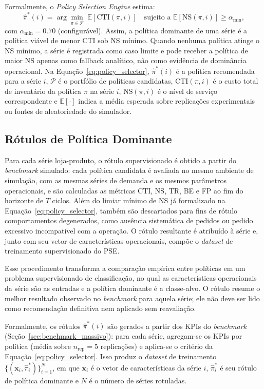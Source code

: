 Formalmente, o \textit{Policy Selection Engine} estima:
\begin{equation}
  \hat{\pi}^*(i) = \arg\min_{\pi \in \mathcal{P}} \; \mathbb{E}[\text{CTI}(\pi, i)]
  \quad \text{sujeito a } \mathbb{E}[\text{NS}(\pi, i)] \geq \alpha_{\text{min}},
  \label{eq:policy_selector}
\end{equation}
com $\alpha_{\text{min}} = 0.70$ (configurável). Assim, a política dominante de uma série é a política viável de menor CTI sob NS mínimo. Quando nenhuma política atinge o NS mínimo, a série é registrada como caso limite e pode receber a política de maior NS apenas como fallback analítico, não como evidência de dominância operacional.
Na Equação~\ref{eq:policy_selector}, $\hat{\pi}^*(i)$ é a política recomendada para a série $i$, $\mathcal{P}$ é o portfólio de políticas candidatas, $\text{CTI}(\pi,i)$ é o custo total de inventário da política $\pi$ na série $i$, $\text{NS}(\pi,i)$ é o nível de serviço correspondente e $\mathbb{E}[\cdot]$ indica a média esperada sobre replicações experimentais ou fontes de aleatoriedade do simulador.

\subsection{Rótulos de Política Dominante}

Para cada série loja-produto, o rótulo supervisionado é obtido a partir do \textit{benchmark} simulado: cada política candidata é avaliada no mesmo ambiente de simulação, com as mesmas séries de demanda e os mesmos parâmetros operacionais, e são calculadas as métricas CTI, NS, TR, BE e FP ao fim do horizonte de $T$ ciclos. Além do limiar mínimo de NS já formalizado na Equação~\ref{eq:policy_selector}, também são descartados para fins de rótulo comportamentos degenerados, como ausência sistemática de pedidos ou pedido excessivo incompatível com a operação. O rótulo resultante é atribuído à série e, junto com seu vetor de características operacionais, compõe o \textit{dataset} de treinamento supervisionado do PSE.

Esse procedimento transforma a comparação empírica entre políticas em um problema supervisionado de classificação, no qual as características operacionais da série são as entradas e a política dominante é a classe-alvo. O rótulo resume o melhor resultado observado no \textit{benchmark} para aquela série; ele não deve ser lido como recomendação definitiva nem aplicado sem reavaliação.

Formalmente, os rótulos $\hat{\pi}^*(i)$ são gerados a partir dos KPIs do \textit{benchmark} (Seção~\ref{sec:benchmark_massivo}): para cada série, agregam-se os KPIs por política (média sobre $n_{\text{rep}} = 5$ replicações) e aplica-se o critério da Equação~\ref{eq:policy_selector}. Isso produz o \textit{dataset} de treinamento $\{(\mathbf{x}_i, \hat{\pi}^*_i)\}_{i=1}^N$, em que $\mathbf{x}_i$ é o vetor de características da série $i$, $\hat{\pi}^*_i$ é seu rótulo de política dominante e $N$ é o número de séries rotuladas.

